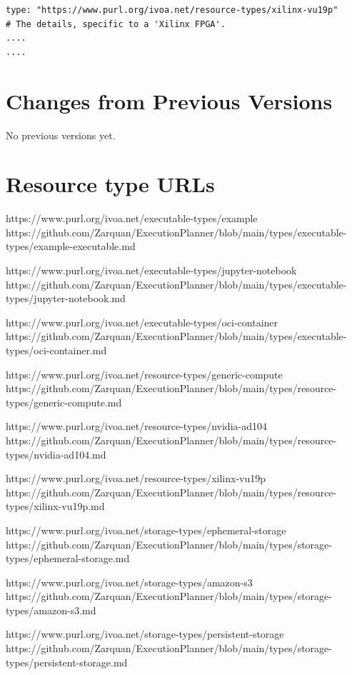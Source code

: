\documentclass[11pt,a4paper]{ivoa}
\begin{document}
\begin{lstlisting}[]
type: "https://www.purl.org/ivoa.net/resource-types/xilinx-vu19p"
# The details, specific to a 'Xilinx FPGA'.
....
....
\end{lstlisting}


\pagebreak
\appendix
\section{Changes from Previous Versions}

No previous versions yet.

\pagebreak
\appendix
\section{Resource type URLs}


https://www.purl.org/ivoa.net/executable-types/example
https://github.com/Zarquan/ExecutionPlanner/blob/main/types/executable-types/example-executable.md

https://www.purl.org/ivoa.net/executable-types/jupyter-notebook
https://github.com/Zarquan/ExecutionPlanner/blob/main/types/executable-types/jupyter-notebook.md

https://www.purl.org/ivoa.net/executable-types/oci-container
https://github.com/Zarquan/ExecutionPlanner/blob/main/types/executable-types/oci-container.md

https://www.purl.org/ivoa.net/resource-types/generic-compute
https://github.com/Zarquan/ExecutionPlanner/blob/main/types/resource-types/generic-compute.md

https://www.purl.org/ivoa.net/resource-types/nvidia-ad104
https://github.com/Zarquan/ExecutionPlanner/blob/main/types/resource-types/nvidia-ad104.md

https://www.purl.org/ivoa.net/resource-types/xilinx-vu19p
https://github.com/Zarquan/ExecutionPlanner/blob/main/types/resource-types/xilinx-vu19p.md

https://www.purl.org/ivoa.net/storage-types/ephemeral-storage
https://github.com/Zarquan/ExecutionPlanner/blob/main/types/storage-types/ephemeral-storage.md

https://www.purl.org/ivoa.net/storage-types/amazon-s3
https://github.com/Zarquan/ExecutionPlanner/blob/main/types/storage-types/amazon-s3.md

https://www.purl.org/ivoa.net/storage-types/persistent-storage
https://github.com/Zarquan/ExecutionPlanner/blob/main/types/storage-types/persistent-storage.md
\end{document}
